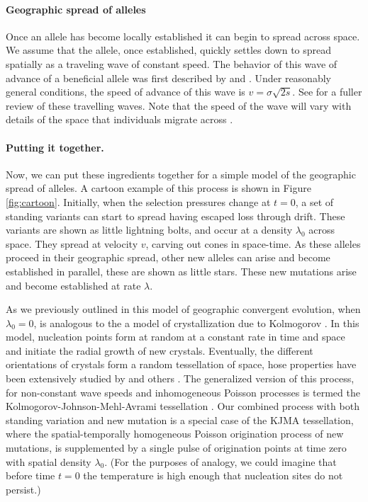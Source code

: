 \documentclass{article}
\begin{document}
\paragraph{Geographic spread of alleles} 
Once an allele has become locally established it can begin to spread across space. 
We assume that the allele, once established, 
quickly settles down to spread spatially as a traveling wave of constant speed. 
The behavior of this wave of advance of a beneficial allele was first described by 
\citet{fisher1937wave} and \citet*{KPP1937}. 
Under reasonably general conditions, the speed of advance of this wave is $v = \sigma \sqrt{2s}$. 
See \citet{ralph2010parallel} for a fuller review of these travelling waves.
Note that the speed of the wave will vary
with details of the space that individuals migrate across
\citep[e.g.\ see ][ for comparisons to migration on discrete grids]{Slatkin-speed:76,SlatkinCharlesworth:78}.

\paragraph{Putting it together.}
Now, we can put these ingredients together for a simple model of the geographic spread of alleles. 
A cartoon example of this process is shown in Figure \ref{fig:cartoon}. 
Initially, when the selection pressures change at $t=0$, 
a set of standing variants can start to spread having escaped loss through drift. 
These variants are shown as little lightning bolts, and occur at a density $\lambda_0$ across space. 
They spread at velocity $v$, carving out cones in space-time. 
As these alleles proceed in their geographic spread, other new alleles can arise and become established in parallel, 
these are shown as little stars. 
These new mutations arise and become established at rate $\lambda$.

As we previously outlined in \citet{ralph2010parallel} this model of
geographic convergent evolution, when $\lambda_0=0$, is analogous to the a model of crystallization due to Kolmogorov \citet{kolmogorov-crystallization}.
In this model, nucleation points form at random at a constant rate in time and space 
and initiate the radial growth of new crystals. 
Eventually, the different orientations of crystals form a random tessellation of space,
hose properties have been extensively studied by \citet{moller92,moller95} and others \citep{bollobas-crystallization,gilbert-crystallization}. 
The generalized version of this process, for non-constant wave speeds
and inhomogeneous Poisson processes is termed the 
Kolmogorov-Johnson-Mehl-Avrami tessellation \citep[KJMA, see ][]{fanfoni-tomellini}.
Our combined process with both standing variation and new mutation is
a special case of the KJMA tessellation, 
where the spatial-temporally homogeneous Poisson origination process of new mutations, 
is supplemented by a single pulse of origination points at time zero with spatial density $\lambda_0$.
(For the purposes of analogy, we could imagine that before time $t=0$
the temperature is high enough that nucleation sites do not persist.)
\end{document}
